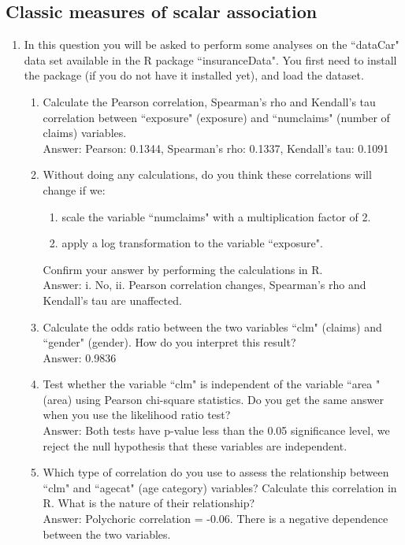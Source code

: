 \documentclass[11pt,a4paper,onecolumn]{article}
\begin{document}
\subsection{Classic measures of scalar association}
\begin{enumerate}
\item In this question you will be asked to perform some analyses on the ``dataCar" data set available in the R package ``insuranceData". You first need to install the package (if you do not have it installed yet), and load the dataset.
\begin{enumerate}
	\item Calculate the Pearson correlation, Spearman's rho and Kendall's tau correlation between ``exposure" (exposure) and ``numclaims" (number of claims) variables. \\
	Answer: Pearson: 0.1344, Spearman's rho:  0.1337, Kendall's tau: 0.1091
	\item Without doing any calculations, do you think these correlations will change if we:
	\begin{enumerate}
		\item scale the variable ``numclaims" with a multiplication factor of 2.
		\item apply a log transformation to the variable ``exposure".
	\end{enumerate}
Confirm your answer by performing the calculations in R. \\
Answer: i. No, ii. Pearson correlation changes, Spearman's rho and Kendall's tau are unaffected.
\item Calculate the odds ratio between the two variables ``clm" (claims) and ``gender" (gender). How do you interpret this result?\\
Answer: 0.9836
\item Test whether the variable ``clm" is independent of the variable ``area
" (area) using Pearson chi-square statistics. Do you get the same answer when you use the likelihood ratio test?\\
Answer: Both tests have p-value less than the 0.05 significance level, we reject the null hypothesis that these variables are independent.
\item Which type of correlation do you use to assess the relationship between ``clm" and ``agecat" (age category) variables? Calculate this correlation in R. What is the nature of their relationship? \\
Answer: Polychoric correlation = -0.06. There is a negative dependence between the two variables.
\end{enumerate}
\end{enumerate}
\end{document}
